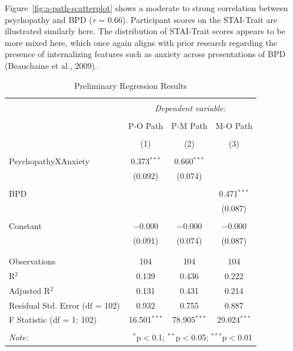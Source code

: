 \documentclass[
  man,floatsintext]{apa7}
\begin{document}
Figure~\ref{fig:a-path-scatterplot} shows a moderate to strong correlation between psychopathy and BPD (\emph{r} = 0.66). Participant scores on the STAI-Trait are illustrated similarly here. The distribution of STAI-Trait scores appears to be more mixed here, which once again aligns with prior research regarding the presence of internalizing features such as anxiety across presentations of BPD (Beauchaine et al., 2009).

\begin{table}[!htbp] \centering 
  \caption{Preliminary Regression Results} 
  \label{tab:prelim-regression-output} 
\begin{tabular}{@{\extracolsep{1pt}}lccc} 
\\[-1.8ex]\hline 
\hline \\[-1.8ex] 
 & \multicolumn{3}{c}{\textit{Dependent variable:}} \\ 
\cline{2-4} 
\\[-1.8ex] & P-O Path & P-M Path & M-O Path \\ 
\\[-1.8ex] & (1) & (2) & (3)\\ 
\hline \\[-1.8ex] 
 PsychopathyXAnxiety & 0.373$^{***}$ & 0.660$^{***}$ &  \\ 
  & (0.092) & (0.074) &  \\ 
  & & & \\ 
 BPD &  &  & 0.471$^{***}$ \\ 
  &  &  & (0.087) \\ 
  & & & \\ 
 Constant & $-$0.000 & $-$0.000 & $-$0.000 \\ 
  & (0.091) & (0.074) & (0.087) \\ 
  & & & \\ 
\hline \\[-1.8ex] 
Observations & 104 & 104 & 104 \\ 
R$^{2}$ & 0.139 & 0.436 & 0.222 \\ 
Adjusted R$^{2}$ & 0.131 & 0.431 & 0.214 \\ 
Residual Std. Error (df = 102) & 0.932 & 0.755 & 0.887 \\ 
F Statistic (df = 1; 102) & 16.501$^{***}$ & 78.905$^{***}$ & 29.024$^{***}$ \\ 
\hline 
\hline \\[-1.8ex] 
\textit{Note:}  & \multicolumn{3}{r}{$^{*}$p$<$0.1; $^{**}$p$<$0.05; $^{***}$p$<$0.01} \\ 
\end{tabular} 
\end{table}
\end{document}
